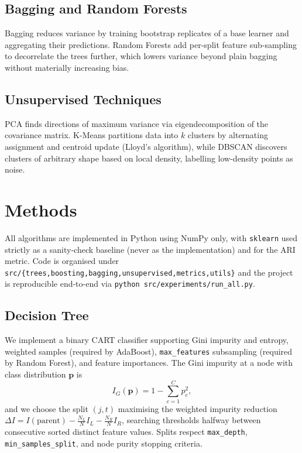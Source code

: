 \documentclass[conference]{IEEEtran}
\begin{document}
\subsection{Bagging and Random Forests}
Bagging \cite{breiman1996bagging} reduces variance by training bootstrap
replicates of a base learner and aggregating their predictions. Random
Forests \cite{breiman2001random} add per-split feature sub-sampling to
decorrelate the trees further, which lowers variance beyond plain bagging
without materially increasing bias.

\subsection{Unsupervised Techniques}
PCA \cite{pearson1901lines} finds directions of maximum variance via eigendecomposition
of the covariance matrix. K-Means \cite{lloyd1982} partitions data into $k$ clusters by
alternating assignment and centroid update (Lloyd's algorithm), while
DBSCAN \cite{ester1996dbscan} discovers clusters of arbitrary shape based on local
density, labelling low-density points as noise.

\section{Methods}
\label{sec:methods}

All algorithms are implemented in Python using NumPy only, with
\texttt{sklearn} used strictly as a sanity-check baseline (never as the
implementation) and for the ARI metric. Code is organised under
\texttt{src/\allowbreak\{trees,\allowbreak boosting,\allowbreak bagging,\allowbreak unsupervised,\allowbreak metrics,\allowbreak utils\}} and the
project is reproducible end-to-end via \texttt{python src/experiments/run\_all.py}.

\subsection{Decision Tree}
\label{sec:methods:tree}
We implement a binary CART classifier supporting Gini impurity and entropy,
weighted samples (required by AdaBoost), \texttt{max\_features} subsampling
(required by Random Forest), and feature importances. The Gini impurity at a
node with class distribution $\mathbf{p}$ is
\begin{equation}
  I_G(\mathbf{p}) = 1 - \sum_{c=1}^{C} p_c^2 ,
\end{equation}
and we choose the split $(j,t)$ maximising the weighted impurity reduction
$\Delta I = I(\text{parent}) - \frac{N_L}{N} I_L - \frac{N_R}{N} I_R$, searching
thresholds halfway between consecutive sorted distinct feature values. Splits
respect \texttt{max\_depth}, \texttt{min\_samples\_split}, and node purity
stopping criteria.
\end{document}
